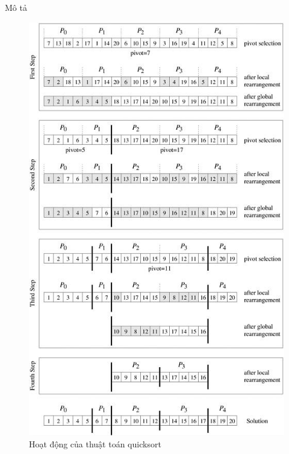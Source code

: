 \documentclass{beamer}
\begin{document}
\begin{frame}{Mô tả}
\begin{figure}[H]
\includegraphics[scale=0.3]{quicksort.jpg}
\caption{Hoạt động của thuật toán quicksort}
\end{figure}
\end{frame}
\end{document}
